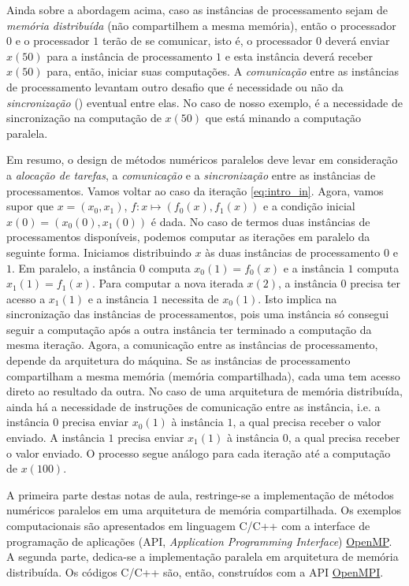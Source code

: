 Ainda sobre a abordagem acima, caso as instâncias de processamento sejam de \emph{memória distribuída} (não compartilhem a mesma memória), então o processador $0$ e o processador $1$ terão de se comunicar, isto é, o processador $0$ deverá enviar $x(50)$ para a instância de processamento $1$ e esta instância deverá receber $x(50)$ para, então, iniciar suas computações. A \emph{comunicação} entre as instâncias de processamento levantam outro desafio que é necessidade ou não da \emph{sincronização} () eventual entre elas. No caso de nosso exemplo, é a necessidade de sincronização na computação de $x(50)$ que está minando a computação paralela.

Em resumo, o design de métodos numéricos paralelos deve levar em consideração a \emph{alocação de tarefas}, a \emph{comunicação} e a \emph{sincronização} entre as instâncias de processamentos. Vamos voltar ao caso da iteração \eqref{eq:intro_in}. Agora, vamos supor que $x = (x_0, x_1)$, $f:x\mapsto (f_0(x), f_1(x))$ e a condição inicial $x(0)=(x_{0}(0), x_{1}(0))$ é dada. No caso de termos duas instâncias de processamentos disponíveis, podemos computar as iterações em paralelo da seguinte forma. Iniciamos distribuindo $x$ às duas instâncias de processamento $0$ e $1$. Em paralelo, a instância $0$ computa $x_{0}(1) = f_0(x)$ e a instância $1$ computa $x_{1}(1) = f_1(x)$. Para computar a nova iterada $x(2)$, a instância $0$ precisa ter acesso a $x_{1}(1)$ e a instância $1$ necessita de $x_{0}(1)$. Isto implica na sincronização das instâncias de processamentos, pois uma instância só consegui seguir a computação após a outra instância ter terminado a computação da mesma iteração. Agora, a comunicação entre as instâncias de processamento, depende da arquitetura do máquina. Se as instâncias de processamento compartilham a mesma memória (memória compartilhada), cada uma tem acesso direto ao resultado da outra. No caso de uma arquitetura de memória distribuída, ainda há a necessidade de instruções de comunicação entre as instância, i.e. a instância $0$ precisa enviar $x_{0}(1)$ à instância $1$, a qual precisa receber o valor enviado. A instância $1$ precisa enviar $x_{1}(1)$ à instância $0$, a qual precisa receber o valor enviado. O processo segue análogo para cada iteração até a computação de $x(100)$.

A primeira parte destas notas de aula, restringe-se a implementação de métodos numéricos paralelos em uma arquitetura de memória compartilhada. Os exemplos computacionais são apresentados em linguagem C/C++ com a interface de programação de aplicações (API, {\it Application Programming Interface}) \href{https://www.openmp.org/}{OpenMP}. A segunda parte, dedica-se a implementação paralela em arquitetura de memória distribuída. Os códigos C/C++ são, então, construídos com a API \href{https://www.open-mpi.org/}{OpenMPI}.
